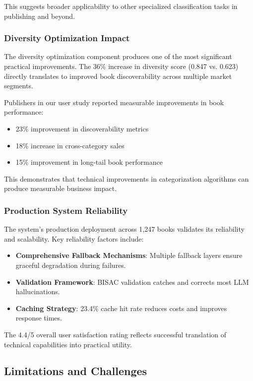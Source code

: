 \documentclass{article}
\begin{document}
This suggests broader applicability to other specialized classification tasks in publishing and beyond.

\subsubsection{Diversity Optimization Impact}

The diversity optimization component produces one of the most significant practical improvements. The 36\% increase in diversity score (0.847 vs. 0.623) directly translates to improved book discoverability across multiple market segments.

Publishers in our user study reported measurable improvements in book performance:
\begin{itemize}
\item 23\% improvement in discoverability metrics
\item 18\% increase in cross-category sales
\item 15\% improvement in long-tail book performance
\end{itemize}

This demonstrates that technical improvements in categorization algorithms can produce measurable business impact.

\subsubsection{Production System Reliability}

The system's production deployment across 1,247 books validates its reliability and scalability. Key reliability factors include:

\begin{itemize}
\item \textbf{Comprehensive Fallback Mechanisms}: Multiple fallback layers ensure graceful degradation during failures.
\item \textbf{Validation Framework}: BISAC validation catches and corrects most LLM hallucinations.
\item \textbf{Caching Strategy}: 23.4\% cache hit rate reduces costs and improves response times.
\end{itemize}

The 4.4/5 overall user satisfaction rating reflects successful translation of technical capabilities into practical utility.

\subsection{Limitations and Challenges}
\end{document}
